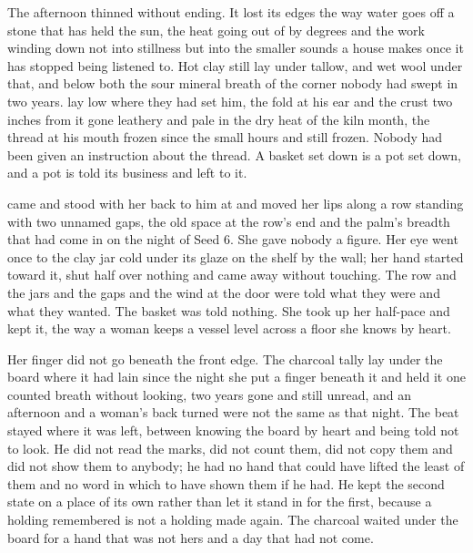The afternoon thinned without ending. It lost its edges the way water goes off a stone that has held the sun, the heat going out of  by degrees and the work winding down not into stillness but into the smaller sounds a house makes once it has stopped being listened to. Hot clay still lay under tallow, and wet wool under that, and below both the sour mineral breath of the  corner nobody had swept in two years.  lay low where they had set him, the fold at his ear and the crust two inches from it gone leathery and pale in the dry heat of the kiln month, the thread at his mouth frozen since the small hours and still frozen. Nobody had been given an instruction about the thread. A basket set down is a pot set down, and a pot is told its business and left to it.

 came and stood with her back to him at  and moved her lips along a row standing with two unnamed gaps, the old space at the row's end and the palm's breadth that had come in on the night of Seed 6. She gave nobody a figure. Her eye went once to the clay jar cold under its glaze on the shelf by the wall; her hand started toward it, shut half over nothing and came away without touching. The row and the jars and the gaps and the wind at the door were told what they were and what they wanted. The basket was told nothing. She took up her half-pace and kept it, the way a woman keeps a vessel level across a floor she knows by heart.

Her finger did not go beneath the front edge. The charcoal tally lay under the board where it had lain since the night she put a finger beneath it and held it one counted breath without looking, two years gone and still unread, and an afternoon and a woman's back turned were not the same as that night. The beat stayed where it was left, between knowing the board by heart and being told not to look. He did not read the marks, did not count them, did not copy them and did not show them to anybody; he had no hand that could have lifted the least of them and no word in which to have shown them if he had. He kept the second state on a place of its own rather than let it stand in for the first, because a holding remembered is not a holding made again. The charcoal waited under the board for a hand that was not hers and a day that had not come.

\scenebreak


